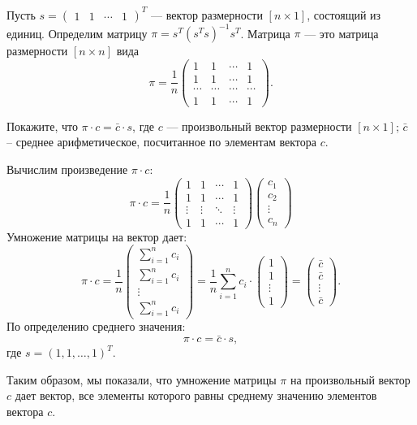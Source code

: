 \documentclass[12pt]{article}
\newcommand{\one}{s} %
\begin{document}
\begin{problem}
Пусть 
$s = 
 \begin{pmatrix}
  1 & 1 & \cdots & 1
 \end{pmatrix}^{T}$ — вектор размерности $[n \times 1]$, состоящий из единиц.
Определим матрицу $\pi = s^{T}(s^{T}s)^{-1}s^{T}$. Матрица $\pi$ — это матрица размерности $[n \times n]$ вида
\[
\pi = \frac{1}{n}
 \begin{pmatrix}
  1 & 1 & \cdots & 1\\
  1 & 1 & \cdots & 1\\
  \cdots & \cdots & \cdots & \cdots \\
  1 & 1 & \cdots & 1
 \end{pmatrix}.
 \]
 
Покажите, что $\pi \cdot c = \bar c \cdot s$, где $c$ — произвольный вектор размерности $[n \times 1]$; $\bar c$ – среднее арифметическое, посчитанное по элементам вектора $c$.
\end{problem}

\begin{sol}

Вычислим произведение $\pi \cdot c$:
\[
\pi \cdot c = \frac{1}{n} 
\begin{pmatrix} 
1 & 1 & \cdots & 1 \\
1 & 1 & \cdots & 1 \\
\vdots & \vdots & \ddots & \vdots \\
1 & 1 & \cdots & 1 
\end{pmatrix}
\begin{pmatrix} c_1 \\ c_2 \\ \vdots \\ c_n \end{pmatrix}
\]
Умножение матрицы на вектор дает:
\[
\pi \cdot c = \frac{1}{n} 
\begin{pmatrix} 
\sum_{i=1}^n c_i \\
\sum_{i=1}^n c_i \\
\vdots \\
\sum_{i=1}^n c_i 
\end{pmatrix}
= \frac{1}{n} \sum_{i=1}^n c_i \cdot 
\begin{pmatrix} 1 \\ 1 \\ \vdots \\ 1 \end{pmatrix} = 
\begin{pmatrix} \bar{c} \\ \bar{c} \\ \vdots \\ \bar{c} \end{pmatrix}.
\]
По определению среднего значения:
\[
\pi \cdot c = \bar{c} \cdot \one,
\]
где $\one = (1, 1, \dots, 1)^T$.

Таким образом, мы показали, что умножение матрицы $\pi$ на произвольный вектор $c$ дает вектор, все элементы которого равны среднему значению элементов вектора $c$.
\end{sol}
\end{document}
